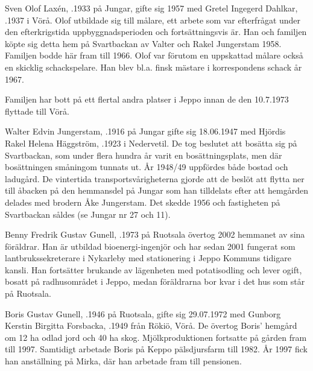 Sven Olof Laxén, .1933 på Jungar, gifte sig 1957 med Gretel Ingegerd Dahlkar, .1937 i Vörå. Olof utbildade sig till målare, ett arbete som var efterfrågat under den efterkrigstida uppbyggnadsperioden och fortsättningsvis är. Han och familjen köpte sig detta hem på Svartbackan av Valter och Rakel Jungerstam 1958. Familjen bodde här fram till 1966. Olof var förutom en uppskattad målare också en skicklig schackspelare. Han blev bl.a. finsk mästare i korrespondens schack år 1967.
\begin{jhchildren}
  \item {}
  \item {}
\end{jhchildren}

Familjen har bott på ett flertal andra platser i Jeppo innan de den 10.7.1973 flyttade till Vörå.


Walter Edvin Jungerstam, .1916 på Jungar gifte sig 18.06.1947 med Hjördis Rakel Helena Häggström, .1923 i Nedervetil. De tog beslutet att bosätta sig på Svartbackan, som under flera hundra år varit en bosättningsplats, men där bosättningen småningom tunnats ut. År 1948/49 uppfördes både bostad och ladugård. De vintertida
transportsvårigheterna gjorde att de beslöt att flytta ner till åbacken på den hemmansdel på Jungar som han tilldelats efter att hemgården delades med brodern Åke Jungerstam. Det skedde 1956 och fastigheten på Svartbackan såldes (se Jungar nr 27 och 11).






Benny Fredrik Gustav Gunell, .1973 på Ruotsala övertog 2002 hemmanet av sina föräldrar. Han är utbildad bioenergi-ingenjör och har sedan 2001 fungerat som lantbrukssekreterare i Nykarleby med stationering i Jeppo Kommuns tidigare kansli. Han fortsätter brukande av lägenheten med potatisodling  och lever ogift, bosatt på radhusområdet i Jeppo, medan föräldrarna bor kvar i det hus som står på Ruotsala.


Boris Gustav Gunell, .1946 på Ruotsala, gifte sig 29.07.1972 med Gunborg Kerstin Birgitta Forsbacka, .1949 från Rökiö, Vörå. De övertog Boris' hemgård om 12 ha odlad jord och 40 ha skog. Mjölkproduktionen fortsatte på gården fram till 1997. Samtidigt arbetade Boris på Keppo pälsdjursfarm till 1982. År 1997 fick han anställning på Mirka, där han arbetade fram till pensionen.


